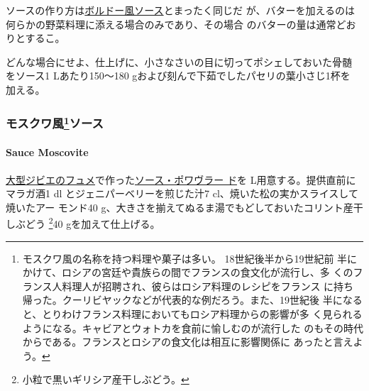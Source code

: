 \begin{recette}

ソースの作り方は\protect\hyperlink{sauce-bordelaise}{ボルドー風ソース}とまったく同じだ
が、バターを加えるのは何らかの野菜料理に添える場合のみであり、その場合
のバターの量は通常どおりとするこ。

どんな場合にせよ、仕上げに、小さなさいの目に切ってポシェしておいた骨髄
をソース1 Lあたり150〜180 gおよび刻んで下茹でしたパセリの葉小さじ1杯を
加える。

\maeaki

\hypertarget{ux30e2ux30b9ux30afux30efux98a856ux30bdux30fcux30b9}{%
\subsubsection[モスクワ風ソース]{\texorpdfstring{モスクワ風\footnote{モスクワ風の名称を持つ料理や菓子は多い。
  18世紀後半から19世紀前
  半にかけて、ロシアの宮廷や貴族らの間でフランスの食文化が流行し、多
  くのフランス人料理人が招聘され、彼らはロシア料理のレシピをフランス
  に持ち帰った。クーリビヤックなどが代表的な例だろう。また、19世紀後
  半になると、とりわけフランス料理においてもロシア料理からの影響が多
  く見られるようになる。キャビアとウォトカを食前に愉しむのが流行した
  のもその時代からである。フランスとロシアの食文化は相互に影響関係に
  あったと言えよう。}ソース}{モスクワ風ソース}}\label{ux30e2ux30b9ux30afux30efux98a856ux30bdux30fcux30b9}}

\hypertarget{sauce-moscovite}{%
\paragraph{Sauce Moscovite}\label{sauce-moscovite}}


\protect\hyperlink{fonds-de-gibier}{大型ジビエのフュメ}で作った\protect\hyperlink{sauce-poivrade}{ソース・ポワヴラー
ド}を\troisquarts{} L用意する。提供直前にマラガ酒1 dl
とジェニパーベリーを煎じた汁7 cl、焼いた松の実かスライスして焼いたアー
モンド40 g、大きさを揃えてぬるま湯でもどしておいたコリント産干しぶどう
\footnote{小粒で黒いギリシア産干しぶどう。}40 gを加えて仕上げる。


\end{recette}
